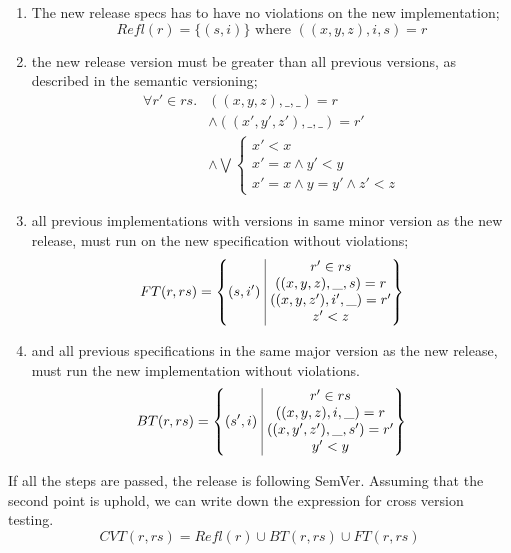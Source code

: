 \begin{enumerate}
    \item The new release specs has to have no violations on the new
    implementation;
    $$ Refl(r) = \{(s, i)\} \text{ where } ((x,y,z), i, s) = r $$
    \item the new release version must be greater than all previous versions, as
    described in the semantic versioning;
    \begin{align*}
        \forall r' \in rs. & ((x,y,z), \_,\_) = r \\ 
                           & \land ((x',y',z'), \_, \_) = r' \\ 
                           & \land \bigvee\left\{ 
        \begin{matrix}
            x' < x \\
            x' = x \land y' < y \\
            x' = x \land y = y' \land z' < z
        \end{matrix}
    \end{align*}
    \item all previous implementations with versions in same minor version as the
    new release, must run on the new specification without violations;
    $$FT(r, rs) = \left\{ (s, i')\ \vline\ 
        \begin{matrix}
            r' \in rs \\
        ((x,y,z), \_, s) = r \\ 
        ((x,y,z'), i', \_) = r'\\
        z' < z \\
        \end{matrix}
    \right\}$$
    \item and all previous specifications in the same major version as the new
    release, must run the new implementation without violations.
    $$BT(r, rs) = \left\{ (s', i)\ \vline\ 
        \begin{matrix}
            r' \in rs \\
        ((x, y, z), i, \_) = r \\ 
        ((x, y', z'), \_, s') = r'\\
        y' < y \\
        \end{matrix}
    \right\}$$
\end{enumerate}

If all the steps are passed, the release is following SemVer. Assuming that the 
second point is uphold, we can write down the expression for cross version testing. 
$$ CVT(r, rs) = Refl(r) \cup BT(r, rs) \cup FT(r, rs) $$

